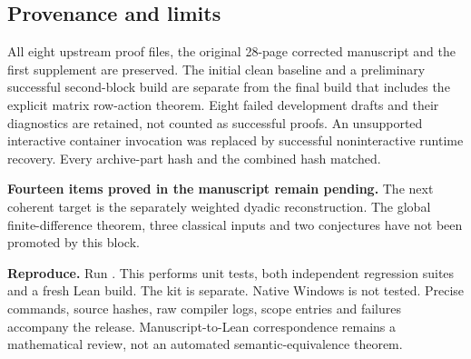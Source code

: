 \subsection*{Provenance and limits}
All eight upstream proof files, the original 28-page corrected manuscript and the first supplement are preserved. The initial clean baseline and a preliminary successful second-block build are separate from the final build that includes the explicit matrix row-action theorem. Eight failed development drafts and their diagnostics are retained, not counted as successful proofs. An unsupported interactive container invocation was replaced by successful noninteractive runtime recovery. Every archive-part hash and the combined hash matched.

\textbf{Fourteen items proved in the manuscript remain pending.} The next coherent target is the separately weighted dyadic reconstruction. The global finite-difference theorem, three classical inputs and two conjectures have not been promoted by this block.

\textbf{Reproduce.} Run . This performs unit tests, both independent regression suites and a fresh Lean build. The kit is separate. Native Windows is not tested. Precise commands, source hashes, raw compiler logs, scope entries and failures accompany the release. Manuscript-to-Lean correspondence remains a mathematical review, not an automated semantic-equivalence theorem.
